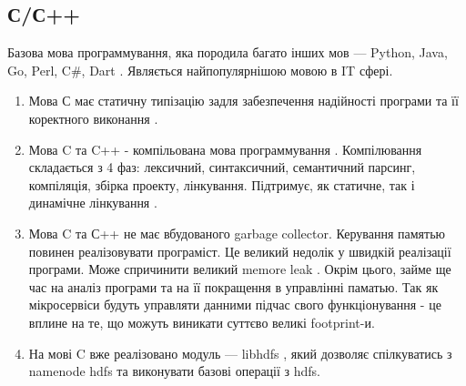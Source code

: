     \subsection{С/С++}

    Базова мова программування, яка породила багато інших мов --- Python, Java, Go, Perl, C\#, Dart \cite{lang2019cfamily}.
    Являється найпопулярнішою мовою в IT сфері.

    \begin{enumerate}
        \item Мова С має статичну типізацію задля забезпечення надійності програми та її коректного виконання \cite{clang2005intro,clang2005dynamic}.
        \item Мова C та C++ - компільована мова программування \cite{compile2014c}.
        Компілювання складається з 4 фаз: лексичний, синтаксичний, семантичний парсинг, компіляція, збірка проекту, лінкування.
        Підтримує, як статичне, так і динамічне лінкування \cite{linking2018clang,linking2019briefly}.
        \item Мова C та С++ не має вбудованого garbage collector. Керування памятью повинен реалізовувати програміст.
        Це великий недолік у швидкій реалізації програми. Може спричинити великий memore leak \cite{clang2005memory}.
        Окрім цього, займе ще час на аналіз програми та на її покращення в управлінні паматью. 
        Так як мікросервіси будуть управляти данними підчас свого функціонування - це вплине на те, що можуть виникати
        суттєво великі footprint-и.
        \item На мові C вже реалізовано модуль --- libhdfs \cite{libhdfs2018}, який дозволяє спілкуватись з namenode hdfs та виконувати базові операції з hdfs.
    \end{enumerate}


